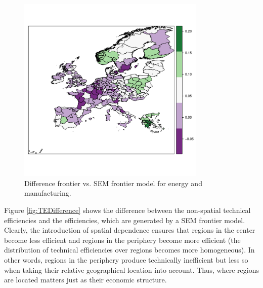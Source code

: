 \documentclass[11pt,parskip,abstracton,notitlepage]{scrartcl}
\begin{document}
\begin{figure}[h]
	\center
	\includegraphics[width=0.8\textwidth]{fig/TEfrontierdiff}
	\caption{Difference frontier vs. SEM frontier model for energy and manufacturing.}
	\label{fig:TEfrontierdiff}
\end{figure}

Figure \ref{fig:TEDifference} shows the difference between the non-spatial technical efficiencies and the efficiencies, which are generated by a SEM frontier model. Clearly, the introduction of spatial dependence ensures that regions in the center become less efficient and regions in the periphery become more efficient (the distribution of technical efficiencies over regions becomes more homogeneous). In other words, regions in the periphery produce technically inefficient but less so when taking their relative geographical location into account. Thus, where regions are located matters just as their economic structure. 
 
\end{document}
